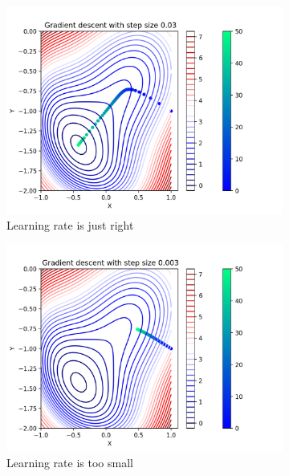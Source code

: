 \begin{figure}[]
  \centering
  \begin{subfigure}[b]{0.32\linewidth}
    \includegraphics[width=\linewidth]{images/gradient_descent_just_right.png}
     \caption{Learning rate is just right}
  \end{subfigure}
  \begin{subfigure}[b]{0.32\linewidth}
    \includegraphics[width=\linewidth]{images/gradient_descent_too_small.png}
     \caption{Learning rate is too small}
  \end{subfigure}
  \begin{subfigure}[b]{0.32\linewidth}

\end{subfigure}
\end{figure}

